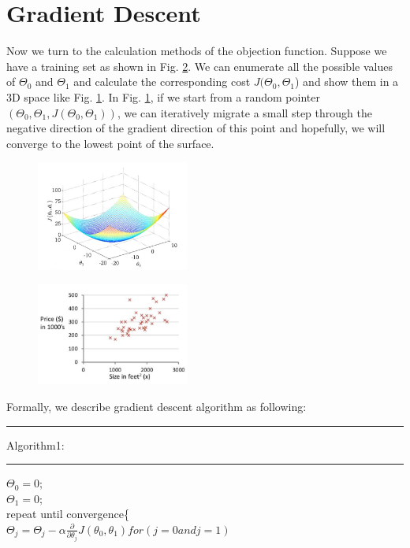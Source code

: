 \documentclass{article}
\begin{document}
\section{Gradient Descent}
Now we turn to the calculation methods of the objection function. Suppose we have a training set as shown in Fig. \ref{training_dataset}. We can enumerate all the possible values of $\Theta_0$ and $\Theta_1$ and calculate the corresponding cost $J(\Theta_0, \Theta_1$) and show them in a 3D space like Fig. \ref{3D_cost_function_plot}. In Fig. \ref{3D_cost_function_plot}, if we start from a random pointer$(\Theta_0, \Theta_1, J(\Theta_0, \Theta_1))$, we can iteratively migrate a small step through the negative direction of the gradient direction of this point and hopefully, we will converge to the lowest point of the surface.
\begin{figure}[ht]
  \centering
  \includegraphics[width=5cm]{Figure2.jpg}\\
  \caption{}\label{3D_cost_function_plot}
\end{figure}
\begin{figure}[ht]
  \centering
  \includegraphics[width=5cm]{Figure3.jpg}\\
  \caption{}\label{training_dataset}
\end{figure}
\newpage
Formally, we describe gradient descent algorithm as following:\\
\medskip
\hrule
\smallskip
Algorithm1:
\smallskip
\hrule
\smallskip
\noindent $\Theta_0 = 0;$\\
$\Theta_1 = 0;$\\
repeat until convergence\{\\
$\Theta_j = \Theta_j - \alpha\frac{\partial}{\partial \theta_j}J(\theta_0, \theta_1) for(j = 0 and j = 1)$\\
\end{document}
